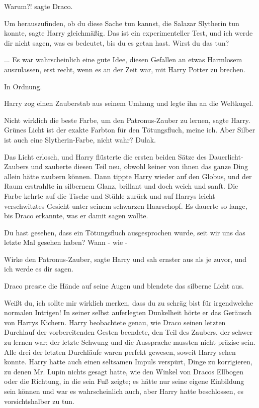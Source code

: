 \glqq Warum?!\grqq{} sagte Draco.

\glqq Um herauszufinden, ob du diese Sache tun kannst, die Salazar Slytherin tun
konnte\grqq{}, sagte Harry gleichmäßig. \glqq Das ist ein experimenteller Test,
und ich werde dir nicht sagen, was es bedeutet, bis du es getan hast. Wirst du
das tun?\grqq{}

... Es war wahrscheinlich eine gute Idee, diesen Gefallen an etwas Harmlosem
auszulassen, erst recht, wenn es an der Zeit war, mit Harry Potter zu brechen.

\glqq In Ordnung.\grqq{}

Harry zog einen Zauberstab aus seinem Umhang und legte ihn an die Weltkugel.

\glqq Nicht wirklich die beste Farbe, um den Patronus-Zauber zu lernen\grqq{},
sagte Harry. \glqq Grünes Licht ist der exakte Farbton für den Tötungsfluch,
meine ich. Aber Silber ist auch eine Slytherin-Farbe, nicht wahr? Dulak.\grqq{}

Das Licht erlosch, und Harry flüsterte die ersten beiden Sätze des
Dauerlicht-Zaubers und zauberte diesen Teil neu, obwohl keiner von ihnen das
ganze Ding allein hätte zaubern können. Dann tippte Harry wieder auf den Globus,
und der Raum erstrahlte in silbernem Glanz, brillant und doch weich und sanft.
Die Farbe kehrte auf die Tische und Stühle zurück und auf Harrys leicht
verschwitztes Gesicht unter seinem schwarzen Haarschopf. Es dauerte so lange,
bis Draco erkannte, was er damit sagen wollte.

\glqq Du hast gesehen, dass ein Tötungsfluch ausgesprochen wurde, seit wir uns
das letzte Mal gesehen haben? Wann - wie -\grqq{}

\glqq Wirke den Patronus-Zauber\grqq{}, sagte Harry und sah ernster aus als je
zuvor, \glqq und ich werde es dir sagen.\grqq{}

Draco presste die Hände auf seine Augen und blendete das silberne Licht aus.

\glqq Weißt du, ich sollte mir wirklich merken, dass du zu schräg bist für
irgendwelche normalen Intrigen!\grqq{} In seiner selbst auferlegten Dunkelheit
hörte er das Geräusch von Harrys Kichern. Harry beobachtete genau, wie Draco
seinen letzten Durchlauf der vorbereitenden Gesten beendete, den Teil des
Zaubers, der schwer zu lernen war; der letzte Schwung und die Aussprache mussten
nicht präzise sein. Alle drei der letzten Durchläufe waren perfekt gewesen,
soweit Harry sehen konnte. Harry hatte auch einen seltsamen Impuls verspürt,
Dinge zu korrigieren, zu denen Mr. Lupin nichts gesagt hatte, wie den Winkel von
Dracos Ellbogen oder die Richtung, in die sein Fuß zeigte; es hätte nur seine
eigene Einbildung sein können und war es wahrscheinlich auch, aber Harry hatte
beschlossen, es vorsichtshalber zu tun.

